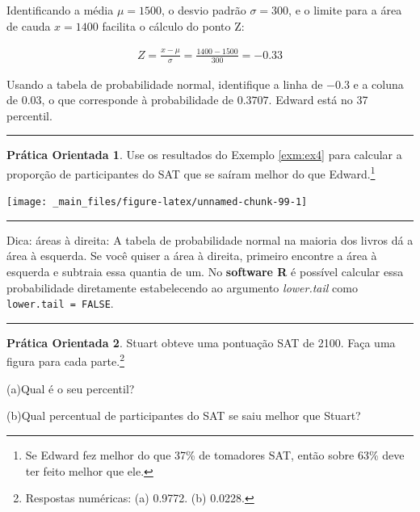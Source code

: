 \documentclass[
]{book}
\theoremstyle{definition}
\theoremstyle{definition}
\theoremstyle{definition}
\newtheorem{exercise}{Prática Orientada}[chapter]
\theoremstyle{definition}
\theoremstyle{remark}
\begin{document}
Identificando a média \(\mu=1500\), o desvio padrão \(\sigma=300\), e o limite para a área de cauda \(x=1400\) facilita o cálculo do ponto Z:

\begin{eqnarray*}
Z = \frac{x - \mu}{\sigma} = \frac{1400 - 1500}{300} = -0.33
\end{eqnarray*}

Usando a tabela de probabilidade normal, identifique a linha de \(-0.3\) e a coluna de \(0.03\), o que corresponde à probabilidade de \(0.3707\). Edward está no 37 percentil.

\begin{center}\rule{0.5\linewidth}{0.5pt}\end{center}

\begin{exercise}
\protect\hypertarget{exr:unnamed-chunk-98}{}{\label{exr:unnamed-chunk-98} }Use os resultados do Exemplo \ref{exm:ex4} para calcular a proporção de participantes do SAT que se saíram melhor do que Edward.\footnote{Se Edward fez melhor do que 37\% de tomadores SAT, então sobre 63\% deve ter feito melhor que ele.}
\end{exercise}

\texttt{[image: \_main\_files/figure-latex/unnamed-chunk-99-1]}

\begin{center}\rule{0.5\linewidth}{0.5pt}\end{center}

Dica: áreas à direita: A tabela de probabilidade normal na maioria dos livros dá a área à esquerda. Se você quiser a área à direita, primeiro encontre a área à esquerda e subtraia essa quantia de um. No \textbf{software R} é possível calcular essa probabilidade diretamente estabelecendo ao argumento \emph{lower.tail} como \texttt{lower.tail\ =\ FALSE}.

\begin{center}\rule{0.5\linewidth}{0.5pt}\end{center}

\begin{exercise}
\protect\hypertarget{exr:unnamed-chunk-100}{}{\label{exr:unnamed-chunk-100} }Stuart obteve uma pontuação SAT de 2100. Faça uma figura para cada parte.\footnote{Respostas numéricas: (a) 0.9772. (b) 0.0228.}

(a)Qual é o seu percentil?

(b)Qual percentual de participantes do SAT se saiu melhor que Stuart?
\end{exercise}
\end{document}
